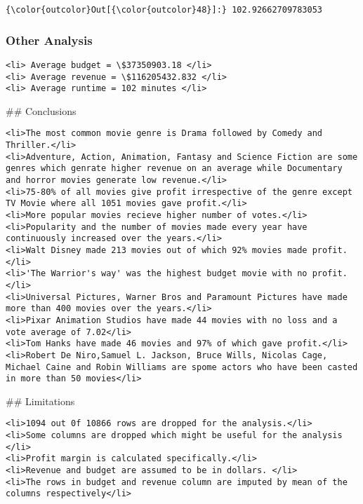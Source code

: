\documentclass[11pt]{article}
\begin{document}
\begin{Verbatim}[commandchars=\\\{\}]
{\color{outcolor}Out[{\color{outcolor}48}]:} 102.92662709783053
\end{Verbatim}
            
    \subsubsection{Other Analysis}\label{other-analysis}

\begin{verbatim}
<li> Average budget = \$37350903.18 </li>
<li> Average revenue = \$116205432.832 </li>
<li> Average runtime = 102 minutes </li>
\end{verbatim}

     \#\# Conclusions

\begin{verbatim}
<li>The most common movie genre is Drama followed by Comedy and Thriller.</li>
<li>Adventure, Action, Animation, Fantasy and Science Fiction are some genres which genrate higher revenue on an average while Documentary and horror movies generate low revenue.</li>
<li>75-80% of all movies give profit irrespective of the genre except TV Movie where all 1051 movies gave profit.</li>
<li>More popular movies recieve higher number of votes.</li>
<li>Popularity and the number of movies made every year have continuously increased over the years.</li>
<li>Walt Disney made 213 movies out of which 92% movies made profit.</li>
<li>'The Warrior's way' was the highest budget movie with no profit.</li>
<li>Universal Pictures, Warner Bros and Paramount Pictures have made more than 400 movies over the years.</li>
<li>Pixar Animation Studios have made 44 movies with no loss and a vote average of 7.02</li>
<li>Tom Hanks have made 46 movies and 97% of which gave profit.</li>
<li>Robert De Niro,Samuel L. Jackson, Bruce Wills, Nicolas Cage, Michael Caine and Robin Williams are spome actors who have been casted in more than 50 movies</li>
\end{verbatim}

     \#\# Limitations

\begin{verbatim}
<li>1094 out 0f 10866 rows are dropped for the analysis.</li>
<li>Some columns are dropped which might be useful for the analysis </li>
<li>Profit margin is calculated specifically.</li>
<li>Revenue and budget are assumed to be in dollars. </li>
<li>The rows in budget and revenue column are imputed by mean of the columns respectively</li>
\end{verbatim}


    
    
    
    
\end{document}

